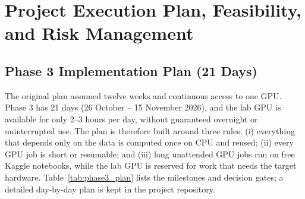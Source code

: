 \documentclass[11pt,a4paper]{article}
\begin{document}
\section{Project Execution Plan, Feasibility, and Risk Management}
\label{sec:execution_plan}

\subsection{Phase 3 Implementation Plan (21 Days)}
The original plan assumed twelve weeks and continuous access to one GPU. Phase 3 has 21 days (26 October -- 15 November 2026), and the lab GPU is available for only 2--3 hours per day, without guaranteed overnight or uninterrupted use. The plan is therefore built around three rules: (i) everything that depends only on the data is computed once on CPU and reused; (ii) every GPU job is short or resumable; and (iii) long unattended GPU jobs run on free Kaggle notebooks, while the lab GPU is reserved for work that needs the target hardware. Table~\ref{tab:phase3_plan} lists the milestones and decision gates; a detailed day-by-day plan is kept in the project repository.
\end{document}
